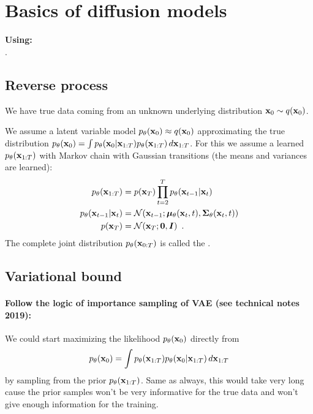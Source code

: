 \clearpage

\section{Basics of diffusion models}\label{sec:diffusion_basics}

\begin{notebox}
\textbf{Using:} 
 \\
.
\end{notebox}

\subsection{Reverse process}

We have true data coming from an unknown underlying distribution ${\mathbf{x}}_0 \sim q({\mathbf{x}}_0)$.

We assume a latent variable model $p_{\theta}({\mathbf{x}}_0) \approx q({\mathbf{x}}_0)$ approximating the true distribution $p_{\theta}({\mathbf{x}}_0) = \int p_{\theta}({\mathbf{x}}_0 | {\mathbf{x}}_{1:T}) p_{\theta}({\mathbf{x}}_{1:T}) \, d{\mathbf{x}}_{1:T}$.
For this we assume a learned  $p_{\theta}({\mathbf{x}}_{1:T})$ with Markov chain with Gaussian transitions (the means and variances are learned):
\begin{align*}
    p_{\theta}({\mathbf{x}}_{1:T}) &= p({\mathbf{x}}_T) \prod_{t=2}^T p_{\theta}({\mathbf{x}}_{t-1} | {\mathbf{x}}_t) \\
    p_{\theta}({\mathbf{x}}_{t-1} | {\mathbf{x}}_t) &= \mathcal{N}({\mathbf{x}}_{t-1}; {\bm{\mu}}_{\theta}({\mathbf{x}}_t, t), {\bm{\Sigma}}_{\theta}({\mathbf{x}}_t, t)) \\
    p({\mathbf{x}}_T) & = \mathcal{N}({\mathbf{x}}_T; \mathbf{0}, {\bm{I}}) \enspace .
\end{align*}
The complete joint distribution $p_{\theta}({\mathbf{x}}_{0:T})$ is called the .

\subsection{Variational bound}

\paragraph{Follow the logic of importance sampling of VAE (see technical notes 2019):}
We could start maximizing the likelihood $p_{\theta}({\mathbf{x}}_0)$ directly from 
\begin{equation}
    p_{\theta}({\mathbf{x}}_0) = \int p_{\theta}({\mathbf{x}}_{1:T}) p_{\theta}({\mathbf{x}}_0 | {\mathbf{x}}_{1:T}) \, d{\mathbf{x}}_{1:T}
\end{equation}
by sampling from the prior $p_{\theta}({\mathbf{x}}_{1:T})$.
Same as always, this would take very long cause the prior samples won't be very informative for the true data and won't give enough information for the training.

